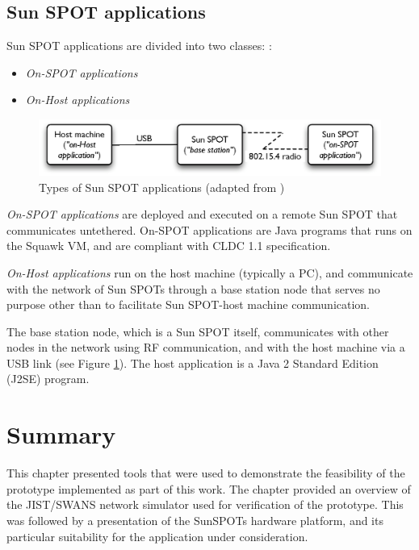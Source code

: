 \subsection{Sun SPOT applications} \label{subsec:sunspotapps}

Sun SPOT applications are divided into two classes:
\cite{sun_developer:2008}:

\begin{itemize}
  \item \emph{On-SPOT applications}
  \item \emph{On-Host applications}
\end{itemize}

\begin{figure}[h]
\centering
\includegraphics[width=\textwidth]{img/SunSPOTS_applications.eps} 
\caption[Types of Sun SPOT applications]{Types of Sun SPOT applications (adapted from
\cite{sun_developer:2008})}
\label{Fig:SunSPOTS_applications}
\end{figure}  

\emph{On-SPOT applications}  are deployed and
executed on a remote Sun SPOT that communicates untethered. On-SPOT
applications are Java programs that runs on the Squawk VM, and are compliant
with CLDC 1.1 specification. 

\emph{On-Host applications} run on the host machine
(typically a PC), and communicate with the network of Sun SPOTs through a base
station node that serves no purpose other than to facilitate Sun SPOT-host
machine communication. 
  
The base station node, which is a Sun SPOT itself, communicates with other
nodes in the network using RF communication, and with the host machine via a
USB link (see Figure \ref{Fig:SunSPOTS_applications}). The host application is
a Java 2 Standard Edition (J2SE) program.
  
 
\section{Summary}

This chapter presented tools that were used to demonstrate the feasibility of
the prototype implemented as part of this work. The chapter provided an overview of the JIST/SWANS
network simulator used for verification of the prototype. This was followed by
a presentation of the SunSPOTs hardware platform, and its particular suitability for the application under
consideration.


  